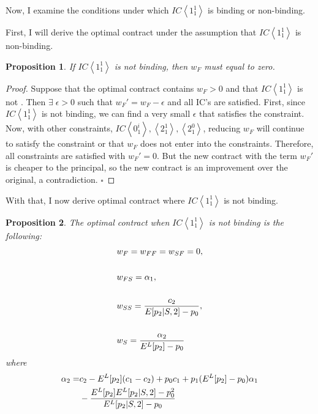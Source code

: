 \documentclass[11pt]{article} %
\theoremstyle{exampstyle}
\newtheorem*{proposition*}{Proposition}
\newcommand{\eq}[1]{\begin{align}#1\end{align}}
\newcommand{\la}{ \left < }
\newcommand{\ra}{ \right > }
\begin{document}
Now, I examine the conditions under which $IC \la 1^1_1 \ra $ is binding or non-binding.

First, I will derive the optimal contract under the assumption that  $IC \la 1^1_1 \ra$ is non-binding.

\begin{proposition*}
If $IC \la 1^1_1 \ra$ is not binding, then $w_F$ must equal to zero.
\end{proposition*}

\begin{proof}
Suppose that the optimal contract contains $w_F>0$ and that $IC \la 1^1_1 \ra$ is not  . 
Then $\exists \; \epsilon>0$ such that $w_F' = w_F - \epsilon$ and all IC's are satisfied. First, since  $IC \la 1^1_1 \ra$ is not binding, we can find a very small $\epsilon$ that 
satisfies the constraint. Now, with other constraints, $IC \la 0^i_1\ra, \la 2^1_1 \ra, \la 2^0_1\ra$, reducing $w_F$ will continue to satisfy the constraint or that $w_F$ does not enter into the constraints. Therefore, all constraints are satisfied with $w_F'=0$. But the new contract with the term $w_F'$ is cheaper to the principal, so the new contract is an improvement over the original, a contradiction. \hspace{.5in} $\square$
                                                                                                                                                                                                                                                                                                                                                                         
\end{proof}

With that, I now derive optimal contract where $IC \la 1^1_1 \ra$ is not binding.

\begin{proposition*}
The optimal contract when $IC \la 1^1_1 \ra$ is not binding is the following:
\eq{
&w_F=w_{FF}=w_{SF}=0, \notag \\
 \notag \\
&w_{FS} =\alpha_1, \notag \\
 \notag \\
 &w_{SS} =\frac{c_2}{E[p_2|S,2] - p_0}, \notag \\
 \notag \\
&w_S= \frac{\alpha_2}{E^L[p_2]-p_0} \notag 
}
where
\eq{
\alpha_2=& c_2 - E^L[p_2](c_1-c_2) +p_0 c_1 + p_1 (E^L[p_2]-p_0) \alpha_1  \notag \\
&- \frac{E^L[p_2]E^L[p_2|S,2]-p_0^2}{E^L[p_2|S,2]-p_0}  \notag 
}
\end{proposition*}
\end{document}
